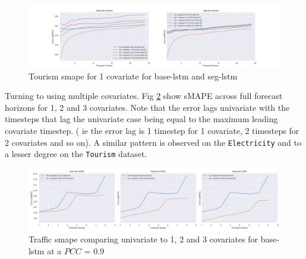 \documentclass{article}
\newcommand{\pearson}{PCC}
\begin{document}
\begin{figure}[ht]
  \centering
  \includegraphics[width=1.\textwidth]{figures/tourism_base-lstm_vs_seg-lstm.png}
  \caption{Tourism smape for 1 covariate for base-lstm and seg-lstm}
  \label{fig:tourism_base_vs_seg}
  \end{figure}
  


Turning to using multiple covariates. Fig \ref{fig:lstm_traffic_univariate_vs_covariate} show sMAPE across full forecast horizons for 1, 2 and 3 covariates. Note that the error lags univariate with the timesteps 
that lag the univariate case being equal to the maximum leading covariate timestep. ( ie the error lag is 1 timestep for 1 covariate, 2 timesteps for 2 covariates and so on). A similar pattern 
is observed on the \texttt{Electricity} and to a lesser degree on the \texttt{Tourism} dataset. 


\begin{figure}[ht]
  \centering
  \includegraphics[width=1.\textwidth]{figures/base-lstm_traffic_univariate_vs_covariate.png}
  \caption{Traffic smape comparing univariate to 1, 2 and 3 covariates for base-lstm at a $\pearson$ = 0.9}
  \label{fig:lstm_traffic_univariate_vs_covariate}
  \end{figure}
  
\end{document}
